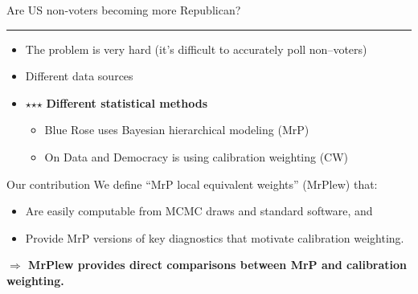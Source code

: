 
\begin{frame}{Are US non-voters becoming more Republican?}

\vspace{1em}
\pause
%
\hrule
\begin{itemize}
\item The problem is very hard (it's difficult to accurately poll non--voters)
\item Different data sources
%
%
\item $\star$$\star$$\star$ \textbf{Different statistical methods}
\begin{itemize}
    \item Blue Rose uses Bayesian hierarchical modeling (MrP)
    \item On Data and Democracy is using calibration weighting (CW)
\end{itemize}
%
\end{itemize}

\pause

\begin{block}{Our contribution}
    We define ``MrP local equivalent weights'' (MrPlew) that:
\begin{itemize}
    \item Are easily computable from MCMC draws and standard software, and
    \item Provide MrP versions of key diagnostics that motivate calibration weighting.
\end{itemize}
%
\textbf{$\Rightarrow$ MrPlew provides direct comparisons between
MrP and calibration weighting.}
%
\end{block}

\end{frame}


